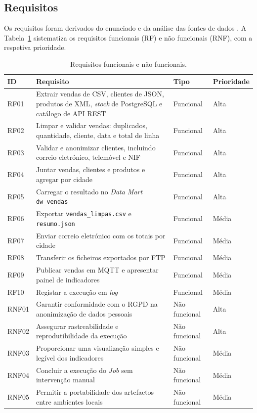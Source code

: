 \documentclass[11pt,a4paper]{article}
\begin{document}
\subsection{Requisitos}
Os requisitos foram derivados do enunciado e da análise das fontes de dados \cite{ferreira2026enunciado}. A Tabela~\ref{tab:requisitos} sistematiza os requisitos funcionais (RF) e não funcionais (RNF), com a respetiva prioridade.

\begin{table}[H]
\centering
\small
\begin{tabular}{|p{1.2cm}|p{8.6cm}|p{1.8cm}|p{1.6cm}|}
\hline
ID & Requisito & Tipo & Prioridade \\ \hline
RF01 & Extrair vendas de CSV, clientes de JSON, produtos de XML, \textit{stock} de PostgreSQL e catálogo de API REST & Funcional & Alta \\ \hline
RF02 & Limpar e validar vendas: duplicados, quantidade, cliente, data e total de linha & Funcional & Alta \\ \hline
RF03 & Validar e anonimizar clientes, incluindo correio eletrónico, telemóvel e NIF & Funcional & Alta \\ \hline
RF04 & Juntar vendas, clientes e produtos e agregar por cidade & Funcional & Alta \\ \hline
RF05 & Carregar o resultado no \textit{Data Mart} \texttt{dw\_vendas} & Funcional & Alta \\ \hline
RF06 & Exportar \texttt{vendas\_limpas.csv} e \texttt{resumo.json} & Funcional & Média \\ \hline
RF07 & Enviar correio eletrónico com os totais por cidade & Funcional & Média \\ \hline
RF08 & Transferir os ficheiros exportados por FTP & Funcional & Média \\ \hline
RF09 & Publicar vendas em MQTT e apresentar painel de indicadores & Funcional & Média \\ \hline
RF10 & Registar a execução em \textit{log} & Funcional & Média \\ \hline
RNF01 & Garantir conformidade com o RGPD na anonimização de dados pessoais & Não funcional & Alta \\ \hline
RNF02 & Assegurar rastreabilidade e reprodutibilidade da execução & Não funcional & Alta \\ \hline
RNF03 & Proporcionar uma visualização simples e legível dos indicadores & Não funcional & Média \\ \hline
RNF04 & Concluir a execução do \textit{Job} sem intervenção manual & Não funcional & Média \\ \hline
RNF05 & Permitir a portabilidade dos artefactos entre ambientes locais & Não funcional & Média \\ \hline
\end{tabular}
\caption{Requisitos funcionais e não funcionais.}
\label{tab:requisitos}
\end{table}
\end{document}
